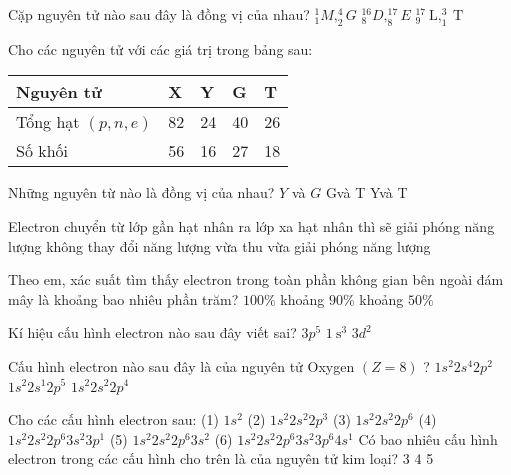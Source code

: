 \begin{ex}
	Cặp nguyên tử nào sau đây là đồng vị của nhau?
	{$_1^1 M,_2^4 G$}
	{$_8^{16} D,_8^{17} E$}
	{$_9^{17} \mathrm{~L},_1^3 \mathrm{~T}$}
\end{ex}
\begin{ex}
	Cho các nguyên tử với các giá trị trong bảng sau:\par
	\begin{center}
		\begin{tabular}{lllll}
		\hline Nguyên tử & X& Y& G& T\\
		\hline Tổng hạt $(p, n, e)$ & 82 & 24 & 40 & 26 \\
		\hline Số khối & 56 & 16 & 27 & 18 \\
		\hline
		\end{tabular}\par
	\end{center}
	Những nguyên từ nào là đồng vị của nhau?
	{$Y$ và $G$}
	{Gvà T}
	{Yvà T}
\end{ex}
\begin{ex}
	Electron chuyển từ lớp gần hạt nhân ra lớp xa hạt nhân thì sẽ
	{giải phóng năng lượng}
	{không thay đổi năng lượng}
	{vừa thu vừa giải phóng năng lượng}
\end{ex}
\begin{ex}
	Theo em, xác suất tìm thấy electron trong toàn phần không gian bên ngoài đám mây là khoảng bao nhiêu phần trăm?
	{$100 \%$}
	{khoảng $90 \%$}
	{khoảng $50 \%$}
\end{ex}
\begin{ex}
	Kí hiệu cấu hình electron nào sau đây viết sai?
	{$3 p^5$}
	{$1 \mathrm{~s}^3$}
	{$3 d^2$}
\end{ex}
\begin{ex}
	Cấu hình electron nào sau đây là của nguyên tử Oxygen $(Z=8)$ ?
	{$1 s^2 2 s^4 2 p^2$}
	{$1 s^2 2 s^1 2 p^5$}
	{$1 s^2 2 s^2 2 p^4$}
\end{ex}
\begin{ex}
	Cho các cấu hình electron sau:
	(1) $1 s^2$
	(2) $1 s^2 2 s^2 2 p^3$
	(3) $1 s^2 2 s^2 2 p^6$
	(4) $1 s^2 2 s^2 2 p^6 3 s^2 3 p^1$
	(5) $1 s^2 2 s^2 2 p^6 3 s^2$
	(6) $1 s^2 2 s^2 2 p^6 3 s^2 3 p^6 4 s^1$
	Có bao nhiêu cấu hình electron trong các cấu hình cho trên là của nguyên tử kim loại?
	{3}
	{4}
	{5}
\end{ex}
\label{\x}